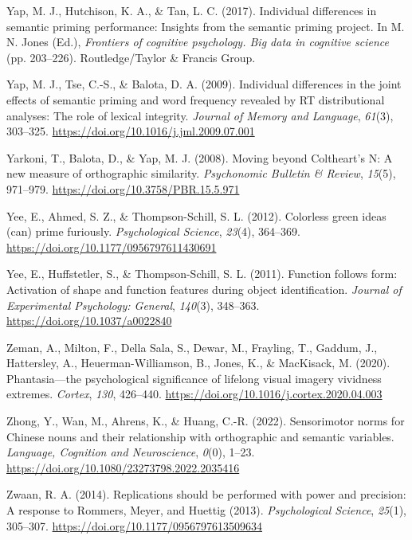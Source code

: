 \documentclass[
  12pt,
  man,floatsintext]{apa7}
\newlength{\cslhangindent}
\newlength{\cslentryspacingunit} %
\newenvironment{CSLReferences}[2] %
 {%
  \setlength{\parindent}{0pt}
  \ifodd #1
  \let\oldpar\par
  \def\par{\hangindent=\cslhangindent\oldpar}
  \fi
  \setlength{\parskip}{#2\cslentryspacingunit}
 }%
 {}
\begin{document}
\begin{CSLReferences}{1}{0}
\leavevmode{}%
Yap, M. J., Hutchison, K. A., \& Tan, L. C. (2017). Individual differences in semantic priming performance: {Insights} from the semantic priming project. In M. N. Jones (Ed.), \emph{Frontiers of cognitive psychology. {Big} data in cognitive science} (pp. 203--226). {Routledge/Taylor \& Francis Group}.

\leavevmode{}%
Yap, M. J., Tse, C.-S., \& Balota, D. A. (2009). Individual differences in the joint effects of semantic priming and word frequency revealed by {RT} distributional analyses: {The} role of lexical integrity. \emph{Journal of Memory and Language}, \emph{61}(3), 303--325. \url{https://doi.org/10.1016/j.jml.2009.07.001}

\leavevmode{}%
Yarkoni, T., Balota, D., \& Yap, M. J. (2008). Moving beyond {Coltheart}'s {N}: {A} new measure of orthographic similarity. \emph{Psychonomic Bulletin \& Review}, \emph{15}(5), 971--979. \url{https://doi.org/10.3758/PBR.15.5.971}

\leavevmode{}%
Yee, E., Ahmed, S. Z., \& Thompson-Schill, S. L. (2012). Colorless green ideas (can) prime furiously. \emph{Psychological Science}, \emph{23}(4), 364--369. \url{https://doi.org/10.1177/0956797611430691}

\leavevmode{}%
Yee, E., Huffstetler, S., \& Thompson-Schill, S. L. (2011). Function follows form: {Activation} of shape and function features during object identification. \emph{Journal of Experimental Psychology: General}, \emph{140}(3), 348--363. \url{https://doi.org/10.1037/a0022840}

\leavevmode{}%
Zeman, A., Milton, F., Della Sala, S., Dewar, M., Frayling, T., Gaddum, J., Hattersley, A., Heuerman-Williamson, B., Jones, K., \& MacKisack, M. (2020). Phantasia---the psychological significance of lifelong visual imagery vividness extremes. \emph{Cortex}, \emph{130}, 426--440. \url{https://doi.org/10.1016/j.cortex.2020.04.003}

\leavevmode{}%
Zhong, Y., Wan, M., Ahrens, K., \& Huang, C.-R. (2022). Sensorimotor norms for {Chinese} nouns and their relationship with orthographic and semantic variables. \emph{Language, Cognition and Neuroscience}, \emph{0}(0), 1--23. \url{https://doi.org/10.1080/23273798.2022.2035416}

\leavevmode{}%
Zwaan, R. A. (2014). Replications should be performed with power and precision: {A} response to {Rommers}, {Meyer}, and {Huettig} (2013). \emph{Psychological Science}, \emph{25}(1), 305--307. \url{https://doi.org/10.1177/0956797613509634}

\end{CSLReferences}
\end{document}
